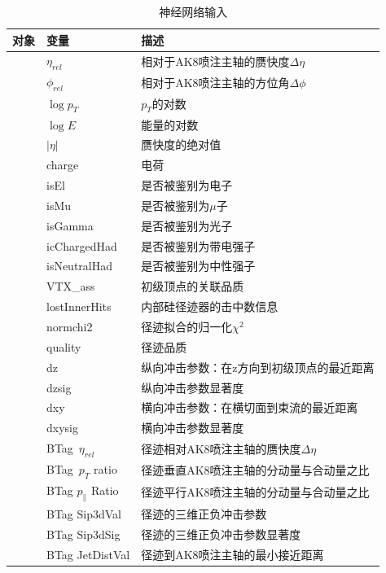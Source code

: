 \begin{table}[htbp]
    \caption{神经网络输入\cite{Javier}}\label{table:5.1}
    \centering
    \begin{tabular}{>{\centering\arraybackslash}p{2.5cm}%
    >{\centering\arraybackslash}p{3cm}%
    >{\centering\arraybackslash}p{9cm}}
    \toprule\toprule
    \textbf{对象} & \textbf{变量} & \textbf{描述}\\
    \midrule
    \multirow{25}{*}{粒子候选者} & $\eta_{rel}$ & 相对于AK8喷注主轴的赝快度$\Delta \eta$\\
    & $\phi_{rel}$ & 相对于AK8喷注主轴的方位角$\Delta \phi$\\
    & $\log{p_T}$ & $p_T$的对数\\
    & $\log{E}$ & 能量的对数\\
    & $|\eta|$ & 赝快度的绝对值\\
    & charge & 电荷\\
    & isEl & 是否被鉴别为电子\\
    & isMu & 是否被鉴别为$\mu$子\\
    & isGamma & 是否被鉴别为光子\\
    & icChargedHad & 是否被鉴别为带电强子\\
    & isNeutralHad & 是否被鉴别为中性强子\\
    & VTX\_ass & 初级顶点的关联品质\\
    & lostInnerHits & 内部硅径迹器的击中数信息\\
    & normchi2 & 径迹拟合的归一化$\chi^2$\\
    & quality & 径迹品质\\
    & dz & 纵向冲击参数：在z方向到初级顶点的最近距离\\
    & dzsig & 纵向冲击参数显著度\\
    & dxy & 横向冲击参数：在横切面到束流的最近距离\\
    & dxysig & 横向冲击参数显著度\\
    & BTag\ $\eta_{rel}$ & 径迹相对AK8喷注主轴的赝快度$\Delta \eta$\\
    & BTag\ $p_T$ ratio & 径迹垂直AK8喷注主轴的分动量与合动量之比\\
    & BTag $p_{\parallel}$ Ratio & 径迹平行AK8喷注主轴的分动量与合动量之比\\
    & BTag Sip3dVal & 径迹的三维正负冲击参数\\
    & BTag Sip3dSig & 径迹的三维正负冲击参数显著度\\
    & BTag JetDistVal & 径迹到AK8喷注主轴的最小接近距离\\

\end{tabular}
\end{table}
